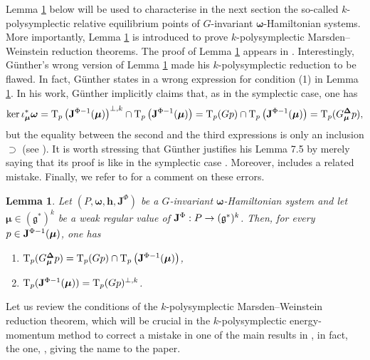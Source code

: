 \documentclass[11pt]{article}
\theoremstyle{plain}
\newtheorem{lemma}[theorem]{Lemma}
\theoremstyle{definition}
\newcommand{\T}{\mathrm{T}}
\newcommand{\bomega}{{\boldsymbol{\omega}}}
\newcommand{\Lg}{\mathfrak{g}}
\numberwithin{equation}{section}
\begin{document}
Lemma \ref{Lemm::NonAdPerpPS} below will be used to characterise in the next section the so-called $k$-polysymplectic relative equilibrium points of $G$-invariant $\bomega$-Hamiltonian systems. More importantly, Lemma \ref{Lemm::NonAdPerpPS} is introduced to prove $k$-polysymplectic Marsden--Weinstein reduction theorems. The proof of Lemma \ref{Lemm::NonAdPerpPS} appears in \cite{LRVZ_23}.  Interestingly, G\"unther's wrong version of Lemma \ref{Lemm::NonAdPerpPS}  made his $k$-polysymplectic reduction to be flawed. In fact, G\"unther states in \cite[Lemma 7.5]{Gun_87} a wrong expression for condition (1) in Lemma 
\ref{Lemm::NonAdPerpPS}. In his work, G\"unther implicitly claims that, as in the symplectic case, one has
$$
\ker \iota_{\bm \mu}^*\bm\omega=\T_{p}\left({\bf J}^{\Phi-1}({\bm\mu})\right)^{\perp,k}\cap \T_{p}\left({\bf J}^{\Phi-1}({\bm\mu})\right)=\T_{p}(G p)\cap \T_{p}\left({\bf J}^{\Phi-1}({\bm\mu})\right)=\T_{p}(G^{\bm\Delta}_{\bm\mu} p),
$$
but the equality between the second and the third expressions is only an inclusion $\supset$ (see \cite[pg. 12]{MRSV_15}). It is worth stressing that G\"unther justifies his Lemma 7.5 by merely saying that its proof is like in the symplectic case \cite[pg. 48]{Gun_87}. 
Moreover, \cite{MRS_04} includes a related mistake. Finally, we refer to \cite[Sections 1 and  2.2]{MRSV_15} for a comment on these errors. 

\begin{lemma}
\label{Lemm::NonAdPerpPS}
Let $(P,\bomega, \bm h,\mathbf{J}^\Phi)$ be a $G$-invariant $\bomega$-Hamiltonian system and let $\bm\mu\in(\Lg^*)^k$ be a weak regular value of  ${\bf J}^\Phi:P\rightarrow (\Lg^*)^k$. Then, for every $p\in {\bf J}^{\Phi-1}(\bm\mu)$, one has 
\begin{enumerate}[{\rm(1)}]
\item $\T_{p}(G^{\bm\Delta}_{\bm\mu} p) =\T_{p}(G p)\cap \T_{p}\left({\bf J}^{\Phi-1}({\bm\mu})\right)$, 
\item $\T_{p}({\bf J}^{\Phi-1}(\bm\mu)) = \T_{p}(Gp)^{\perp,k}$.
\end{enumerate}
\end{lemma}


Let us review the conditions of the $k$-polysymplectic Marsden--Weinstein reduction theorem, which will be crucial in the $k$-polysymplectic energy-momentum method to correct a mistake in one of the main results in \cite{GM_23}, in fact, the one, \cite[Proposition 1]{GM_23}, giving the name to the paper. 
\end{document}
